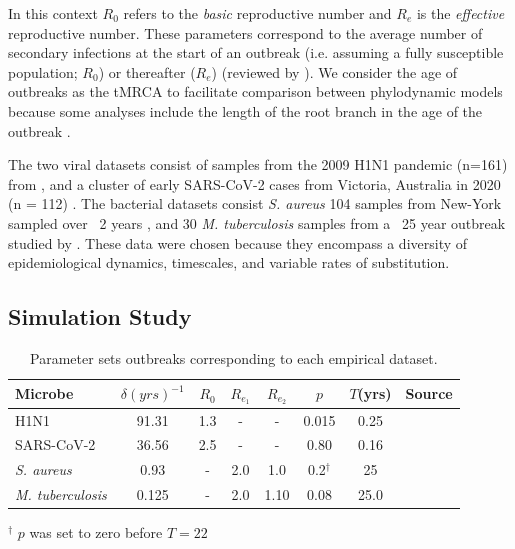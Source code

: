 \documentclass[11pt]{article}
\begin{document}
\begin{spacing}{1.5}
In this context $R_0$ refers to the \textit{basic} reproductive number and $R_e$ is the \textit{effective} reproductive number. These parameters correspond to the average number of secondary infections at the start of an outbreak (i.e. assuming a fully susceptible population; $R_0$) or thereafter ($R_e$) (reviewed by \citep{featherstone2022epidemiological, du2015getting, kuhnert2011phylogenetic}). We consider the age of outbreaks as the tMRCA to facilitate comparison between phylodynamic models because some analyses include the length of the root branch in the age of the outbreak \citep{stadler2012estimating}.

The two viral datasets consist of samples from the 2009 H1N1 pandemic (n=161) from \citet{hedge_2013_real-time}, and a cluster of early SARS-CoV-2 cases from  Victoria, Australia in 2020 (n = 112) \citep{lane2021genomics}. The bacterial datasets consist \textit{S. aureus} 104 samples from New-York sampled over ~2 years \citet{duchene_2016_genome,volz_modeling_2018,uhlemann_molecular_2014}, and 30 \textit{M. tuberculosis} samples from a ~25 year outbreak studied by \citet{kuhnert_tuberculosis_2018}. These data were chosen because they encompass a diversity of epidemiological dynamics, timescales, and variable rates of substitution.

\subsection*{Simulation Study}

\begin{table}[H]
    \centering
    \caption{Parameter sets outbreaks corresponding to each empirical dataset.}
    \begin{tabular}{l|c|c|c|c|c|c|l|}
    \hline
    Microbe                     &   $\delta (yrs)^{-1}$    & $R_0$ &   $R_{e_1}$   &  $R_{e_2}$    &   $p$   &   $T$(yrs)   & Source \\
    \hline
    H1N1                        &   91.31    & 1.3 &   -   &  -    &   0.015   &   0.25 & \citet{hedge_2013_real-time} \\
    SARS-CoV-2                  &   36.56    & 2.5 &   -   &  -   &   0.80   &  0.16 & \citet{lane2021genomics} \\
    \textit{S. aureus}    &   0.93    &  - &   2.0   &  1.0   &   0.2$^{\dagger}$   &   25 & \citet{duchene_2016_genome} \\
    \textit{M. tuberculosis}    &   0.125    &  - &   2.0   &  1.10    &   0.08   &   25.0 & \citet{kuhnert_tuberculosis_2018} \\
    \hline
    \end{tabular}
    \label{tab:sim_parms}
\end{table}
\footnotesize{$^\dagger$ $p$ was set to zero before $T=22$}


\end{spacing}
\end{document}
